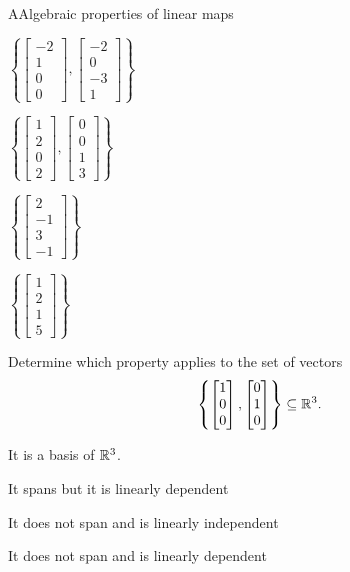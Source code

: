 \documentclass{article}[12pt]
\begin{document}
\begin{module}{A}{Algebraic properties of linear maps}
\begin{readinessAssuranceTest}
  \begin{multicols}{4}
  \begin{readinessAssuranceTestChoices}
  \item $\left\{ \begin{bmatrix} -2 \\ 1 \\ 0 \\ 0 \end{bmatrix}, \begin{bmatrix} -2 \\ 0 \\ -3 \\ 1 \end{bmatrix} \right\}$ %
  \item $\left\{ \begin{bmatrix} 1 \\ 2 \\ 0 \\ 2 \end{bmatrix}, \begin{bmatrix} 0 \\ 0 \\ 1 \\ 3 \end{bmatrix} \right\}$
  \item $\left\{ \begin{bmatrix} 2 \\ -1 \\ 3 \\ -1 \end{bmatrix} \right\}$
  \item $\left\{ \begin{bmatrix} 1 \\ 2 \\ 1 \\ 5 \end{bmatrix} \right\}$
  \end{readinessAssuranceTestChoices}
  \end{multicols}


  \item Determine which property applies to the set of vectors $$\left\{ \begin{bmatrix}  1 \\ 0 \\ 0 \end{bmatrix}, \begin{bmatrix} 0 \\ 1 \\ 0 \end{bmatrix} \right\} \subseteq \mathbb{R}^3.$$
  \begin{readinessAssuranceTestChoices}
  \item It is a basis of $\mathbb{R}^3$.
  \item It spans but it is linearly dependent
  \item It does not span and is linearly independent %
  \item It does not span and is linearly dependent
  \end{readinessAssuranceTestChoices}



\end{readinessAssuranceTest}
\end{module}
\end{document}
